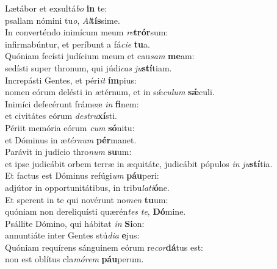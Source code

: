 \evenverse Lætábor et exsultá\textit{bo} \textbf{in} te:~\*\\
\evenverse psallam nómini tu\textit{o}, \textit{Al}\textbf{tís}sime.\\
\oddverse In converténdo inimícum meum \textit{re}\textbf{trór}sum:~\*\\
\oddverse infirmabúntur, et períbunt a fá\textit{ci}\textit{e} \textbf{tu}a.\\
\evenverse Quóniam fecísti judícium meum et cau\textit{sam} \textbf{me}am:~\*\\
\evenverse sedísti super thronum, qui júdi\textit{cas} \textit{ju}\textbf{stí}tiam.\\
\oddverse Increpásti Gentes, et péri\textit{it} \textbf{ím}pius:~\*\\
\oddverse nomen eórum delésti in ætérnum, et in sǽ\textit{cu}\textit{lum} \textbf{sǽ}culi.\\
\evenverse Inimíci defecérunt frámeæ \textit{in} \textbf{fi}nem:~\*\\
\evenverse et civitátes eórum \textit{de}\textit{stru}\textbf{xí}sti.\\
\oddverse Périit memória eórum \textit{cum} \textbf{só}nitu:~\*\\
\oddverse et Dóminus in æ\textit{tér}\textit{num} \textbf{pér}manet.\\
\evenverse Parávit in judício thro\textit{num} \textbf{su}um:~\*\\
\evenverse et ipse judicábit orbem terræ in æquitáte, judicábit pópulos \textit{in} \textit{ju}\textbf{stí}tia.\\
\oddverse Et factus est Dóminus refúgi\textit{um} \textbf{páu}peri:~\*\\
\oddverse adjútor in opportunitátibus, in tribu\textit{la}\textit{ti}\textbf{ó}ne.\\
\evenverse Et sperent in te qui novérunt no\textit{men} \textbf{tu}um:~\*\\
\evenverse quóniam non dereliquísti quærén\textit{tes} \textit{te}, \textbf{Dó}mine.\\
\oddverse Psállite Dómino, qui hábitat \textit{in} \textbf{Si}on:~\*\\
\oddverse annuntiáte inter Gentes stú\textit{di}\textit{a} \textbf{e}jus:\\
\evenverse Quóniam requírens sánguinem eórum re\textit{cor}\textbf{dá}tus est:~\*\\
\evenverse non est oblítus cla\textit{mó}\textit{rem} \textbf{páu}perum.\\
